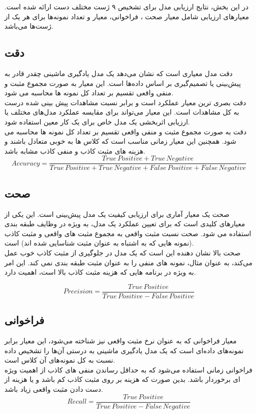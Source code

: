 در این بخش، نتایج ارزیابی مدل برای تشخیص ۹ ژست مختلف دست ارائه شده است. معیارهای ارزیابی شامل معیار صحت ، فراخوانی، معیار  و
تعداد نمونه‌ها برای هر یک از ژست‌ها می‌باشد.


\subsection{دقت}
دقت مدل معیاری است که نشان می‌دهد یک مدل یادگیری ماشینی چقدر قادر به پیش‌بینی یا تصمیم‌گیری بر اساس داده‌ها است. این معیار به صورت مجموع مثبت و منفی واقعی تقسیم بر تعداد کل نمونه ها محاسبه می شود.
\\
دقت بصری ترین معیار عملکرد است و برابر نسبت مشاهدات پیش بینی شده درست به کل مشاهدات است. این معیار می‌تواند برای مقایسه عملکرد مدل‌های مختلف یا ارزیابی اثربخشی یک مدل خاص برای یک کار معین استفاده شود.
\\
دقت به صورت مجموع مثبت و منفی واقعی تقسیم بر تعداد کل نمونه ها محاسبه می شود. همچنین این معیار زمانی مناسب است که کلاس ها به خوبی متعادل باشند و هزینه های مثبت کاذب و منفی کاذب مشابه باشد.
\[ Accuracy = \frac{True \, Positive + True \, Negative}{True \, Positive + True \, Negative +  False \, Positive + False \, Negative} \]

\subsection{صحت}
صحت یک معیار آماری برای ارزیابی کیفیت یک مدل پیش‌بینی است. این یکی از معیارهای کلیدی است که برای تعیین عملکرد یک مدل، به ویژه در وظایف طبقه بندی استفاده می شود. صحت نسبت مثبت واقعی به مجموع مثبت های واقعی و مثبت کاذب (نمونه هایی که به اشتباه به عنوان مثبت شناسایی شده اند) است.
\\
صحت بالا نشان دهنده این است که یک مدل در جلوگیری از مثبت کاذب خوب عمل می‌کند، به عنوان مثال، نمونه های منفی را به عنوان مثبت طبقه بندی نمی کند. این امر به ویژه در برنامه هایی که هزینه مثبت کاذب بالا است، اهمیت دارد. 

\[ Precision = \frac{True \, Positive}{True \, Positive - False \, Positive} \]

\subsection{فراخوانی}
معیار فراخوانی که به عنوان نرخ مثبت واقعی نیز شناخته می‌شود، این معیار برابر نمونه‌های داده‌ای است که یک مدل یادگیری ماشینی به درستی آن‌ها را تشخیص داده نسبت به کل نمونه‌های آن کلاس است.
\\
فراخوانی زمانی استفاده می‌شود که به حداقل رساندن منفی های کاذب از اهمیت ویژه ای برخوردار باشد. بدین صورت که هزینه بر روی مثبت کاذب کم باشد و یا هزینه از دست دادن مثبت واقعی زیاد باشد. 
\[ Recall = \frac{True \, Positive}{True \, Positive - False \, Negative} \]

